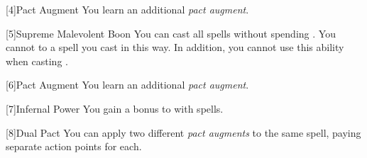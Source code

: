         [4]{Pact Augment} You learn an additional \textit{pact augment}.

        [5]{Supreme Malevolent Boon} You can cast all spells without spending .
        You cannot  to a spell you cast in this way.
        In addition, you cannot use this ability when casting .

        [6]{Pact Augment} You learn an additional \textit{pact augment}.

        [7]{Infernal Power} You gain a  bonus to  with spells.

        [8]{Dual Pact} You can apply two different \textit{pact augments} to the same spell, paying separate action points for each.
